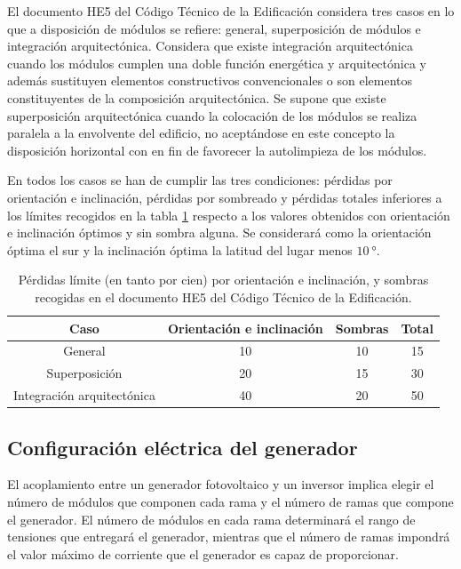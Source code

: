 El documento HE5 del Código Técnico de la Edificación considera tres
casos en lo que a disposición de módulos se refiere: general, superposición
de módulos e integración arquitectónica. Considera que existe integración
arquitectónica cuando los módulos cumplen una doble función energética
y arquitectónica y además sustituyen elementos constructivos convencionales
o son elementos constituyentes de la composición arquitectónica. Se
supone que existe superposición arquitectónica cuando la colocación
de los módulos se realiza paralela a la envolvente del edificio, no
aceptándose en este concepto la disposición horizontal con en fin
de favorecer la autolimpieza de los módulos. 

En todos los casos se han de cumplir las tres condiciones: pérdidas
por orientación e inclinación, pérdidas por sombreado y pérdidas totales
inferiores a los límites recogidos en la tabla \ref{tab:Perdidas-limiteCTE}
respecto a los valores obtenidos con orientación e inclinación óptimos
y sin sombra alguna. Se considerará como la orientación óptima el
sur y la inclinación óptima la latitud del lugar menos $\SI{10}{\degree}$. 

%
\begin{table}
\caption{Pérdidas límite (en tanto por cien) por orientación e inclinación,
y sombras recogidas en el documento HE5 del Código Técnico de la Edificación.\label{tab:Perdidas-limiteCTE}}


\begin{tabular}{cccc}
\toprule 
Caso & Orientación e inclinación & Sombras & Total\tabularnewline
\midrule
\midrule 
General  & 10 & 10 & 15\tabularnewline
\midrule 
Superposición & 20 & 15 & 30\tabularnewline
\midrule 
Integración arquitectónica & 40 & 20 & 50\tabularnewline
\bottomrule
\end{tabular}
\end{table}


\subsection{Configuración eléctrica del generador}
\label{sub:ConfiguracionGenerador}

El acoplamiento entre un generador fotovoltaico y un inversor implica
elegir el número de módulos que componen cada rama y el número de
ramas que compone el generador. El número de módulos en cada rama
determinará el rango de tensiones que entregará el generador, mientras
que el número de ramas impondrá el valor máximo de corriente que el
generador es capaz de proporcionar.

